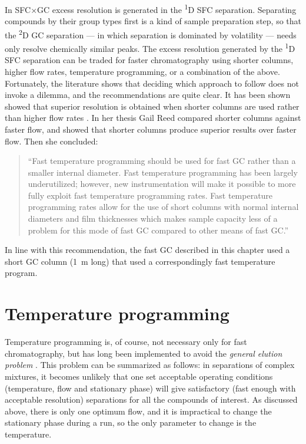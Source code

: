 
In SFC×GC excess resolution is generated in the \textsuperscript{1}D SFC
separation. Separating compounds by their group types first
\autocite{Venter2006} is a kind of sample preparation step, so that the
\textsuperscript{2}D GC separation --- in which separation is dominated by
volatility --- needs only resolve chemically similar peaks. The excess
resolution generated by the \textsuperscript{1}D SFC separation can be traded
for faster chromatography using shorter columns, higher flow rates, temperature
programming, or a combination of the above. Fortunately, the literature shows
that deciding which approach to follow does not invoke a dilemma, and the
recommendations are quite clear. It has been shown showed that superior
resolution is obtained when shorter columns are used rather than higher flow
rates \autocite{Klee2002}. In her thesis Gail Reed \autocite{Reed1999} compared
shorter columns against faster flow, and showed that shorter columns produce
superior results over faster flow.
Then she concluded:

\begin{quotation}

``Fast temperature programming should be used for fast GC rather than a smaller
internal diameter. Fast temperature programming has been largely underutilized;
however, new instrumentation will make it possible to more fully exploit fast
temperature programming rates. Fast temperature programming rates allow for the
use of short columns with normal internal diameters and film thicknesses which
makes sample capacity less of a problem for this mode of fast GC compared to
other means of fast GC.''

\end{quotation}

In line with this recommendation, the fast GC described in this chapter used a
short GC column (\SI{1}{\metre} long) that used a correspondingly fast
temperature program.

\section{Temperature programming}

Temperature programming is, of course, not necessary only for fast
chromatography, but has long been implemented to avoid the \textit{general
elution problem} \autocite[p. 779]{Skoog2007}. This problem can be summarized as
follows: in separations of complex mixtures, it becomes unlikely that one set
acceptable operating conditions (temperature, flow and stationary phase) will
give satisfactory (fast enough with acceptable resolution) separations for all
the compounds of interest. As discussed above, there is only one optimum flow,
and it is impractical to change the stationary phase during a run, so the only
parameter to change is the temperature.


